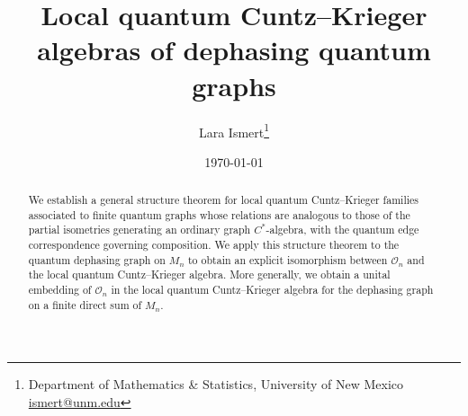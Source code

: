 \documentclass[11pt]{article}
\theoremstyle{plain}
\theoremstyle{nonumberplain}
\theoremstyle{plain}
\theoremstyle{nonumberplain}
\newcommand\1{{\bf 1}}
\newcommand\cO{{\mathcal O}}
\newcommand{\<}{\left\langle}
\renewcommand{\>}{\right\rangle}
\begin{document}


\title{Local quantum Cuntz--Krieger algebras of dephasing quantum graphs}
\author{Lara Ismert\footnote{Department of Mathematics \& Statistics, University of New Mexico \hfill \url{ismert@unm.edu}}}
\date{\today}


\maketitle

\begin{abstract}
We establish a general structure theorem for local quantum Cuntz--Krieger families associated to finite quantum graphs whose relations are analogous to those of the partial isometries generating an ordinary graph $C^*$-algebra, with the quantum edge correspondence governing composition. We apply this structure theorem to the quantum dephasing graph on $M_n$ to obtain an explicit isomorphism between $\cO_n$ and the local quantum Cuntz--Krieger algebra. More generally, we obtain a unital embedding of $\cO_n$ in the local quantum Cuntz--Krieger algebra for the dephasing graph on a finite direct sum of $M_n$.  %

\end{abstract}

\end{document}
